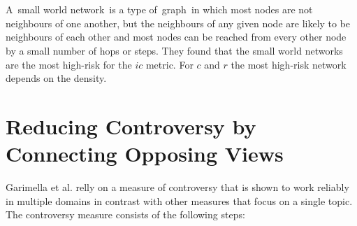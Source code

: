  \\
 \\
 A small world network is a type of graph in which most nodes are not neighbours of one another, but the neighbours of any given node are likely to be neighbours of each other and most nodes can be reached from every other node by a small number of hops or steps. They found that the small world networks are the most high-risk for the $ic$ metric. For $c$ and $r$ the most high-risk network depends on the density.\cite{chen}

\section{Reducing Controversy by Connecting Opposing Views}
\label{sec:reducing}

Garimella et al. relly on a measure of controversy that is shown to work reliably in multiple domains in contrast with other measures that focus on a single topic. The controversy measure consists of the following steps:

